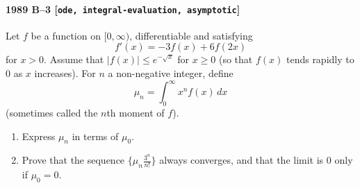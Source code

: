 \paragraph{1989 B--3 \textnormal{[\texttt{ode, integral-evaluation, asymptotic}]}}
Let $f$ be a function on $[0,\infty)$, differentiable and satisfying
\[
f'(x)=-3f(x)+6f(2x)
\]
for $x>0$. Assume that $|f(x)|\le e^{-\sqrt{x}}$ for $x\ge 0$ (so that
$f(x)$ tends rapidly to $0$ as $x$ increases).
For $n$ a non-negative integer, define
\[
\mu_n=\int_0^\infty x^n f(x)\,dx
\]
(sometimes called the $n$th moment of $f$).
\begin{enumerate}
\item[a)] Express $\mu_n$ in terms of $\mu_0$.
\item[b)] Prove that the sequence $\{\mu_n \frac{3^n}{n!}\}$ always converges,
and that the limit is $0$ only if $\mu_0=0$.
\end{enumerate}
